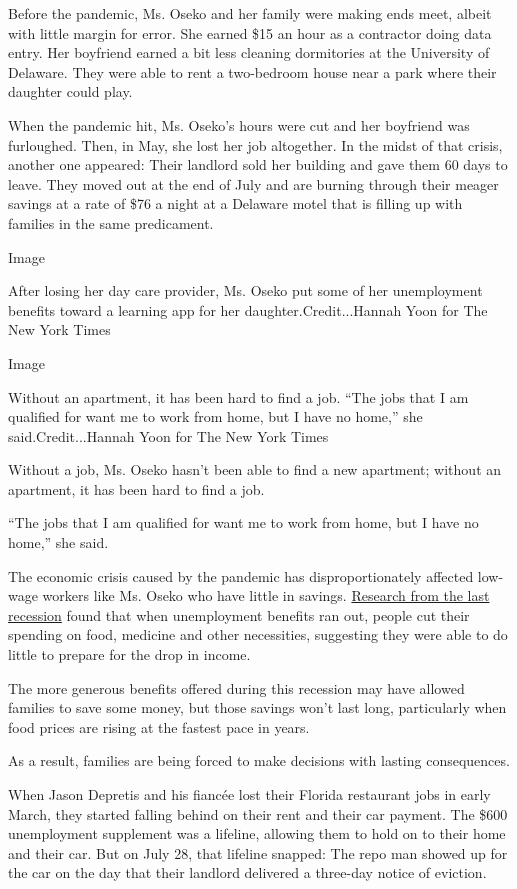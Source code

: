 Before the pandemic, Ms. Oseko and her family were making ends meet,
albeit with little margin for error. She earned \$15 an hour as a
contractor doing data entry. Her boyfriend earned a bit less cleaning
dormitories at the University of Delaware. They were able to rent a
two-bedroom house near a park where their daughter could play.

When the pandemic hit, Ms. Oseko's hours were cut and her boyfriend was
furloughed. Then, in May, she lost her job altogether. In the midst of
that crisis, another one appeared: Their landlord sold her building and
gave them 60 days to leave. They moved out at the end of July and are
burning through their meager savings at a rate of \$76 a night at a
Delaware motel that is filling up with families in the same predicament.

Image

After losing her day care provider, Ms. Oseko put some of her
unemployment benefits toward a learning app for her
daughter.Credit...Hannah Yoon for The New York Times

Image

Without an apartment, it has been hard to find a job. ``The jobs that I
am qualified for want me to work from home, but I have no home,'' she
said.Credit...Hannah Yoon for The New York Times

Without a job, Ms. Oseko hasn't been able to find a new apartment;
without an apartment, it has been hard to find a job.

``The jobs that I am qualified for want me to work from home, but I have
no home,'' she said.

The economic crisis caused by the pandemic has disproportionately
affected low-wage workers like Ms. Oseko who have little in savings.
\href{https://www.aeaweb.org/articles?id=10.1257/aer.20170537}{Research
from the last recession} found that when unemployment benefits ran out,
people cut their spending on food, medicine and other necessities,
suggesting they were able to do little to prepare for the drop in
income.

The more generous benefits offered during this recession may have
allowed families to save some money, but those savings won't last long,
particularly when food prices are rising at the fastest pace in years.

As a result, families are being forced to make decisions with lasting
consequences.

When Jason Depretis and his fiancée lost their Florida restaurant jobs
in early March, they started falling behind on their rent and their car
payment. The \$600 unemployment supplement was a lifeline, allowing them
to hold on to their home and their car. But on July 28, that lifeline
snapped: The repo man showed up for the car on the day that their
landlord delivered a three-day notice of eviction.


